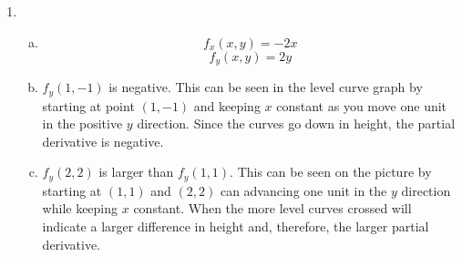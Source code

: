 \documentclass{article}
\begin{document}
\begin{enumerate}[1.]
  \item \begin{enumerate}[a.]
      \item $$ f_{x}(x, y) = -2x $$
        $$ f_{y}(x, y) = 2y $$
      \item $f_{y}(1, -1)$ is negative. This can be seen in the level curve
        graph by starting at point $(1, -1)$ and keeping $x$ constant as you
        move one unit in the positive $y$ direction. Since the curves go down in
        height, the partial derivative is negative.
      \item $f_{y}(2, 2)$ is larger than $f_{y}(1, 1)$. This can be seen on the
        picture by starting at $(1, 1)$ and $(2, 2)$ can advancing one unit in
        the $y$ direction while keeping $x$ constant. When the more level curves
        crossed will indicate a larger difference in height and, therefore, the
        larger partial derivative.
    \end{enumerate}
\end{enumerate}
\end{document}
